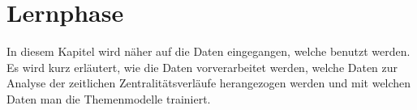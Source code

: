 \chapter{Lernphase}
\label{chap:workflowData}

In diesem Kapitel wird näher auf die Daten eingegangen, welche benutzt werden. Es wird kurz erläutert, wie die Daten vorverarbeitet werden, welche Daten zur Analyse der zeitlichen Zentralitätsverläufe herangezogen werden und mit welchen Daten man die Themenmodelle trainiert.






